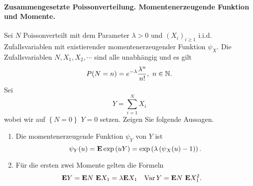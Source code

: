 \paragraph{Zusammengesetzte Poissonverteilung. Momentenerzeugende Funktion und Momente.}
Sei $N$ Poissonverteilt mit dem Parameter $\lambda>0$ und $\left( X_i
\right)_{i\geq 1}$ i.i.d.  Zufallsvariablen mit existierender
momentenerzeugender Funktion $\psi_X$. Die Zufallsvariablen $N, X_1, X_2,
\cdots$ sind alle unabhängig und es gilt 
\begin{equation*}
    P(N=n) = e^{-\lambda} \frac{\lambda^n}{ n!}, \ n\in\mathbb N. 
\end{equation*}
Sei
\begin{equation*}
    Y = \sum_{i=1}^{N} X_i
\end{equation*}
wobei wir auf $\left\{ N=0 \right\}$ $Y=0$ setzen. Zeigen Sie folgende Aussagen.
\begin{enumerate}
    \item Die momentenerzeugende Funktion $\psi_Y$ von $Y$ ist
        \begin{equation*}
            \psi_Y(u) = \mathbf{E} \exp \left( u Y \right) = 
            \exp \left( \lambda \left( \psi_X(u)-1 \right)  \right).
        \end{equation*}
    \item Für die ersten zwei Momente gelten die Formeln
        \begin{align*}
            \mathbf{E} Y &= \mathbf{E} N \ \mathbf{E} X_1 = \lambda \mathbf{E} X_1 & 
            \operatorname{Var} Y &= \mathbf{E} N \ \mathbf{E} X_1^2. 
        \end{align*}
\end{enumerate}

